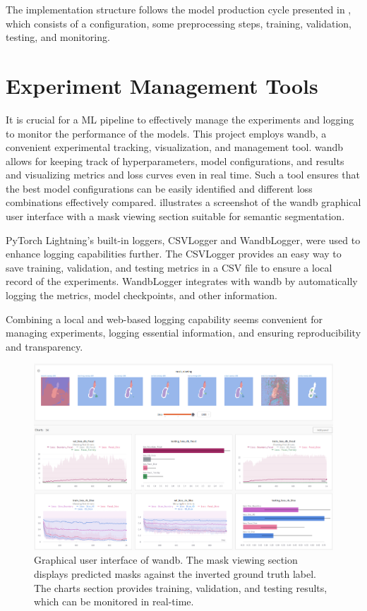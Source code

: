 The implementation structure follows the model production cycle presented in , which consists of a configuration, some preprocessing steps, training, validation, testing, and monitoring.

\section{Experiment Management Tools}
\label{sec:experiment_management_tools}
It is crucial for a \ac{ML} pipeline to effectively manage the experiments and logging to monitor the performance of the models. This project employs \ac{wandb}, a convenient experimental tracking, visualization, and management tool. \ac{wandb} allows for keeping track of hyperparameters, model configurations, and results and visualizing metrics and loss curves even in real time. Such a tool ensures that the best model configurations can be easily identified and different loss combinations effectively compared.  illustrates a screenshot of the \ac{wandb} graphical user interface with a mask viewing section suitable for semantic segmentation.

PyTorch Lightning's built-in loggers, CSVLogger and WandbLogger, were used to enhance logging capabilities further. The CSVLogger provides an easy way to save training, validation, and testing metrics in a CSV file to ensure a local record of the experiments. WandbLogger integrates with \ac{wandb} by automatically logging the metrics, model checkpoints, and other information.

Combining a local and web-based logging capability seems convenient for managing experiments, logging essential information, and ensuring reproducibility and transparency.
\begin{figure}[H]%
  \centering
  \includegraphics[width=\imgWidthXL]{images/wandb.png}
  \caption[Weights and Biases]{Graphical user interface of \acf{wandb}. The mask viewing section displays predicted masks against the inverted ground truth label. The charts section provides training, validation, and testing results, which can be monitored in real-time.}
  \label{wandb}
\end{figure}
